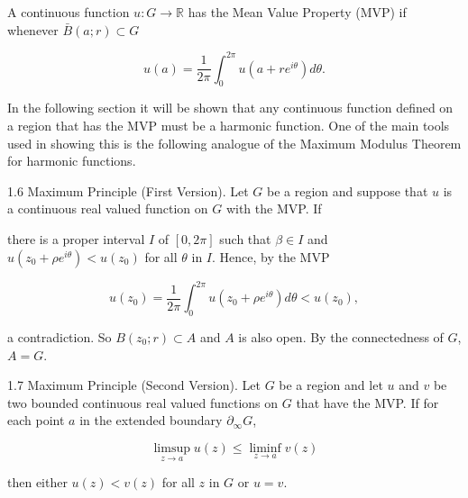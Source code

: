 A continuous function $u: G \rightarrow \mathbb{R}$ has the Mean Value Property (MVP) if whenever $\bar{B}(a; r) \subset G$

$$u(a) = \frac{1}{2\pi} \int_0^{2\pi} u(a + re^{i\theta}) d\theta.$$

In the following section it will be shown that any continuous function defined on a region that has the MVP must be a harmonic function. One of the main tools used in showing this is the following analogue of the Maximum Modulus Theorem for harmonic functions.

1.6 Maximum Principle (First Version). Let $G$ be a region and suppose that $u$ is a continuous real valued function on $G$ with the MVP. If

there is a proper interval $I$ of $[0, 2\pi]$ such that $\beta \in I$ and $u(z_0 + \rho e^{i\theta}) < u(z_0)$ for all $\theta$ in $I$. Hence, by the MVP

$$u(z_0) = \frac{1}{2\pi} \int_0^{2\pi} u(z_0 + \rho e^{i\theta}) d\theta < u(z_0),$$

a contradiction. So $B(z_0; r) \subset A$ and $A$ is also open. By the connectedness of $G$, $A = G$.

1.7 Maximum Principle (Second Version). Let $G$ be a region and let $u$ and $v$ be two bounded continuous real valued functions on $G$ that have the MVP. If for each point $a$ in the extended boundary $\partial_\infty G$,

$$\limsup_{z \to a} u(z) \leq \liminf_{z \to a} v(z)$$

then either $u(z) < v(z)$ for all $z$ in $G$ or $u = v$.